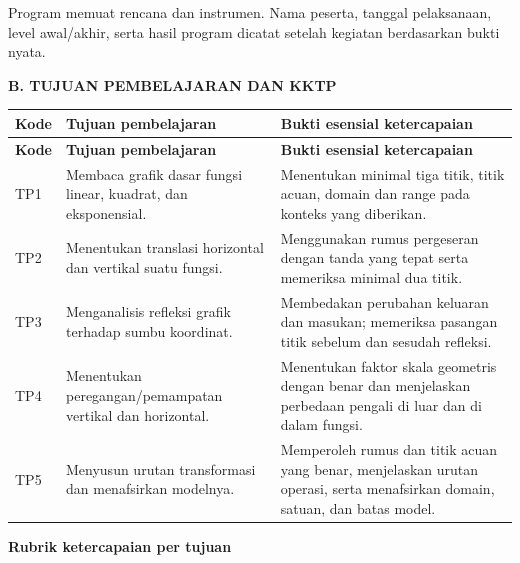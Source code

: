 \documentclass[11pt,a4paper]{article}
\begin{document}
{\small Program memuat rencana dan instrumen. Nama peserta, tanggal pelaksanaan, level awal/akhir, serta hasil program dicatat setelah kegiatan berdasarkan bukti nyata.\par}\medskip
\clearpage
\begin{center}\bfseries\large B. TUJUAN PEMBELAJARAN DAN KKTP\end{center}\medskip
{\small\setlength{\tabcolsep}{2mm}\renewcommand{\arraystretch}{1.35}\begin{longtable}{|>{\raggedright\arraybackslash}p{16.269mm}|>{\raggedright\arraybackslash}p{67.787mm}|>{\raggedright\arraybackslash}p{81.344mm}|}\hline
\rowcolor{gray!10}\textbf{Kode} & \textbf{Tujuan pembelajaran} & \textbf{Bukti esensial ketercapaian}\\ \hline
\endfirsthead
\rowcolor{gray!10}\textbf{Kode} & \textbf{Tujuan pembelajaran} & \textbf{Bukti esensial ketercapaian}\\ \hline
\endhead
TP1 & Membaca grafik dasar fungsi linear, kuadrat, dan eksponensial. & Menentukan minimal tiga titik, titik acuan, domain dan range pada konteks yang diberikan.\\ \hline
TP2 & Menentukan translasi horizontal dan vertikal suatu fungsi. & Menggunakan rumus pergeseran dengan tanda yang tepat serta memeriksa minimal dua titik.\\ \hline
TP3 & Menganalisis refleksi grafik terhadap sumbu koordinat. & Membedakan perubahan keluaran dan masukan; memeriksa pasangan titik sebelum dan sesudah refleksi.\\ \hline
TP4 & Menentukan peregangan/pemampatan vertikal dan horizontal. & Menentukan faktor skala geometris dengan benar dan menjelaskan perbedaan pengali di luar dan di dalam fungsi.\\ \hline
TP5 & Menyusun urutan transformasi dan menafsirkan modelnya. & Memperoleh rumus dan titik acuan yang benar, menjelaskan urutan operasi, serta menafsirkan domain, satuan, dan batas model.\\ \hline
\end{longtable}}\medskip
\par\medskip\noindent\textbf{Rubrik ketercapaian per tujuan}\par\smallskip
\end{document}

